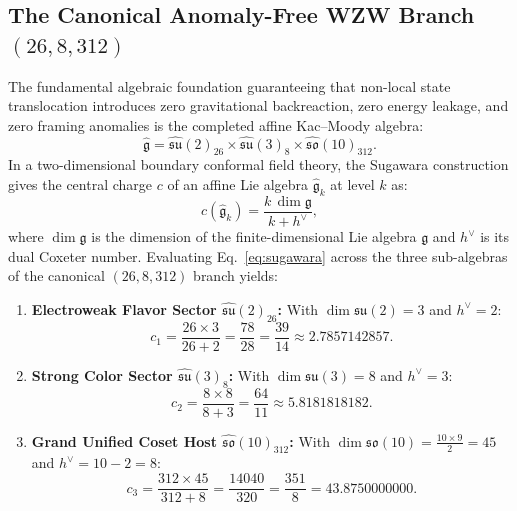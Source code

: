 \documentclass[11pt,onecolumn]{article}
\begin{document}
\FloatBarrier
\subsection{The Canonical Anomaly-Free WZW Branch \texorpdfstring{$(26, 8, 312)$}{(26, 8, 312)}}
The fundamental algebraic foundation guaranteeing that non-local state translocation introduces zero gravitational backreaction, zero energy leakage, and zero framing anomalies is the completed affine Kac--Moody algebra:
\begin{equation}
\widehat{\mathfrak{g}} = \widehat{\mathfrak{su}}(2)_{26} \times \widehat{\mathfrak{su}}(3)_{8} \times \widehat{\mathfrak{so}}(10)_{312}.
\label{eq:wzw_algebra}
\end{equation}
In a two-dimensional boundary conformal field theory, the Sugawara construction gives the central charge $c$ of an affine Lie algebra $\widehat{\mathfrak{g}}_k$ at level $k$ as:
\begin{equation}
c(\widehat{\mathfrak{g}}_k) = \frac{k\,\dim\mathfrak{g}}{k + h^\vee},
\label{eq:sugawara}
\end{equation}
where $\dim\mathfrak{g}$ is the dimension of the finite-dimensional Lie algebra $\mathfrak{g}$ and $h^\vee$ is its dual Coxeter number. Evaluating Eq.~\eqref{eq:sugawara} across the three sub-algebras of the canonical $(26, 8, 312)$ branch yields:
\begin{enumerate}
    \item \textbf{Electroweak Flavor Sector $\widehat{\mathfrak{su}}(2)_{26}$:}
    With $\dim\mathfrak{su}(2) = 3$ and $h^\vee = 2$:
    \begin{equation}
    c_1 = \frac{26 \times 3}{26 + 2} = \frac{78}{28} = \frac{39}{14} \approx 2.7857142857.
    \end{equation}
    \item \textbf{Strong Color Sector $\widehat{\mathfrak{su}}(3)_{8}$:}
    With $\dim\mathfrak{su}(3) = 8$ and $h^\vee = 3$:
    \begin{equation}
    c_2 = \frac{8 \times 8}{8 + 3} = \frac{64}{11} \approx 5.8181818182.
    \end{equation}
    \item \textbf{Grand Unified Coset Host $\widehat{\mathfrak{so}}(10)_{312}$:}
    With $\dim\mathfrak{so}(10) = \frac{10 \times 9}{2} = 45$ and $h^\vee = 10 - 2 = 8$:
    \begin{equation}
    c_3 = \frac{312 \times 45}{312 + 8} = \frac{14040}{320} = \frac{351}{8} = 43.8750000000.
    \end{equation}
\end{enumerate}
\end{document}
